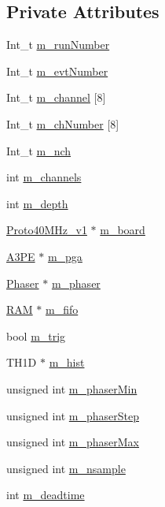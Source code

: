 \subsection*{Private Attributes}
\begin{DoxyCompactItemize}
\item 
Int\+\_\+t \hyperlink{classPhaserScan_a158add7f69adba5e4623afda6c9b31e2}{m\+\_\+run\+Number}
\item 
Int\+\_\+t \hyperlink{classPhaserScan_a038d4303bd3f2446417ec2af5d9995cf}{m\+\_\+evt\+Number}
\item 
Int\+\_\+t \hyperlink{classPhaserScan_a983fb003ef3c41d1dcf1078247548d82}{m\+\_\+channel} \mbox{[}8\mbox{]}
\item 
Int\+\_\+t \hyperlink{classPhaserScan_a6fd741cbc6a81d527e25aa9e8c7f27e0}{m\+\_\+ch\+Number} \mbox{[}8\mbox{]}
\item 
Int\+\_\+t \hyperlink{classPhaserScan_aa73583dea3f784eaacaffdd356e51e9d}{m\+\_\+nch}
\item 
int \hyperlink{classPhaserScan_a3e9894ae646ed25d26a07532c1a2b8b7}{m\+\_\+channels}
\item 
int \hyperlink{classPhaserScan_a445487a8eea9b6d484ae8615cb1bd52d}{m\+\_\+depth}
\item 
\hyperlink{classProto40MHz__v1}{Proto40\+M\+Hz\+\_\+v1} $\ast$ \hyperlink{classPhaserScan_aec1f340810d0cf1f98155673385ffff5}{m\+\_\+board}
\item 
\hyperlink{classA3PE}{A3\+PE} $\ast$ \hyperlink{classPhaserScan_a2065860536763c7f9fd6b8b41908e673}{m\+\_\+pga}
\item 
\hyperlink{classPhaser}{Phaser} $\ast$ \hyperlink{classPhaserScan_ae2726b0d199ca8ae713cea55866d4ae3}{m\+\_\+phaser}
\item 
\hyperlink{classRAM}{R\+AM} $\ast$ \hyperlink{classPhaserScan_a4249cdec58c8163d9f3663be8e929cdf}{m\+\_\+fifo}
\item 
bool \hyperlink{classPhaserScan_ab3fd16cfcce13a09f5c1e91d96de60e6}{m\+\_\+trig}
\item 
T\+H1D $\ast$ \hyperlink{classPhaserScan_abd6954d739e7b2b0d36d09a080146d60}{m\+\_\+hist}
\item 
unsigned int \hyperlink{classPhaserScan_a65f83dd6b9e6c62cd828ef7b094c0361}{m\+\_\+phaser\+Min}
\item 
unsigned int \hyperlink{classPhaserScan_aed5bcb2582744f73a6189544c272213b}{m\+\_\+phaser\+Step}
\item 
unsigned int \hyperlink{classPhaserScan_ab47dd8cf441f9c713aa8c3e2251b382d}{m\+\_\+phaser\+Max}
\item 
unsigned int \hyperlink{classPhaserScan_a6c2089bb98fa8a897430b17ddb052447}{m\+\_\+nsample}
\item 
int \hyperlink{classPhaserScan_aef87ca678cea59093899a7cd138a9e25}{m\+\_\+deadtime}
\end{DoxyCompactItemize}
